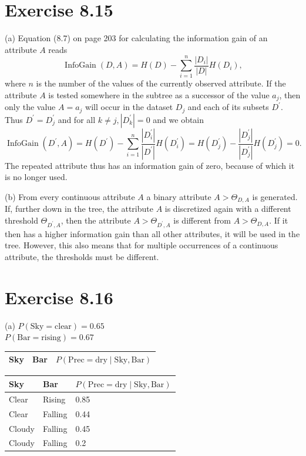 \documentclass[10pt]{book}
\begin{document}
\section{Exercise 8.15}
(a) Equation (8.7) on page 203 for calculating the information gain of an attribute $A$ reads
\[
\operatorname{InfoGain}(D, A)=H(D)-\sum_{i=1}^{n} \frac{\left|D_{i}\right|}{|D|} H\left(D_{i}\right),
\]
where $n$ is the number of the values of the currently observed attribute. If the attribute $A$ is tested somewhere in the subtree as a successor of the value $a_{j}$, then only the value $A=a_{j}$ will occur in the dataset $D_{j}$ and each of its subsets $D^{\prime}$. Thus $D^{\prime}=D_{j}^{\prime}$ and for all $k \neq j,\left|D_{k}^{\prime}\right|=0$ and we obtain
\[
\operatorname{InfoGain}\left(D^{\prime}, A\right)=H\left(D^{\prime}\right)-\sum_{i=1}^{n} \frac{\left|D_{i}^{\prime}\right|}{\left|D^{\prime}\right|} H\left(D_{i}^{\prime}\right)=H\left(D_{j}^{\prime}\right)-\frac{\left|D_{j}^{\prime}\right|}{\left|D_{j}^{\prime}\right|} H\left(D_{j}^{\prime}\right)=0.
\]
The repeated attribute thus has an information gain of zero, because of which it is no longer used.

(b) From every continuous attribute $A$ a binary attribute $A>\Theta_{D, A}$ is generated. If, further down in the tree, the attribute $A$ is discretized again with a different threshold $\Theta_{D^{\prime}, A}$, then the attribute $A>\Theta_{D^{\prime}, A}$ is different from $A>\Theta_{D, A}$. If it then has a higher information gain than all other attributes, it will be used in the tree. However, this also means that for multiple occurrences of a continuous attribute, the thresholds must be different.

\section{Exercise 8.16}
(a) $P(\text{Sky}=\text{clear})=0.65$ \\
$P(\text{Bar}=\text{rising})=0.67$
\begin{center}
\begin{tabular}{lll}
\hline
Sky & Bar & $P(\mathrm{Prec}=\mathrm{dry}\mid \mathrm{Sky}, \mathrm{Bar})$ \\
\hline
\end{tabular}
\end{center}
\begin{tabular}{lll}
\hline
Sky & Bar & $P(\text{Prec}=\text{dry}\mid \text{Sky}, \text{Bar})$ \\
\hline
Clear & Rising & 0.85 \\
Clear & Falling & 0.44 \\
Cloudy & Falling & 0.45 \\
Cloudy & Falling & 0.2 \\
\hline
\end{tabular}
\end{document}
